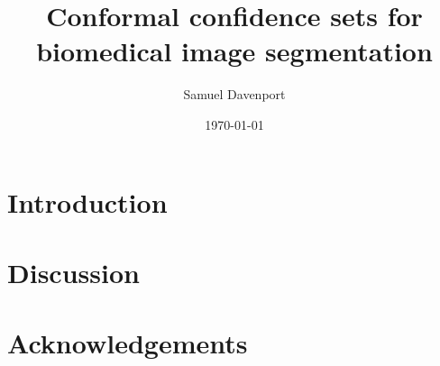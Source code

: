 \documentclass[12pt]{article}
\title{Conformal confidence sets for biomedical image segmentation}
\author{Samuel Davenport}
\date{\today}
\theoremstyle{definition}
\begin{document}
	
\maketitle

\begin{abstract}
	
\end{abstract}

\section{Introduction}




\section{Discussion}



\section*{Acknowledgements}








\end{document}
